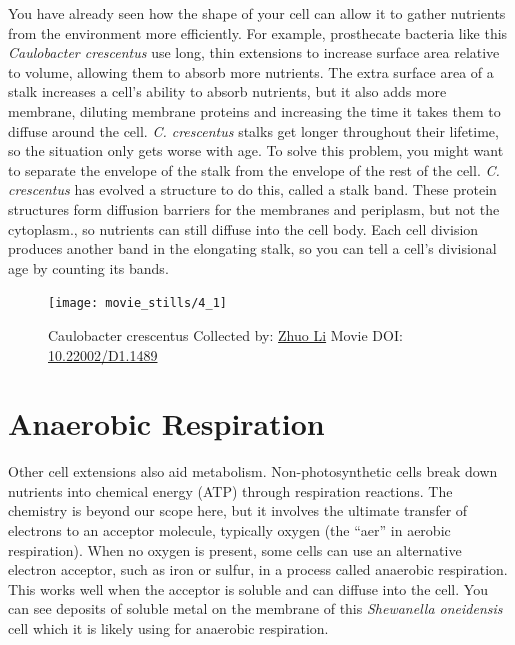\documentclass[]{tufte-book}
\begin{document}
You have already seen how the shape of your cell can allow it to gather
nutrients from the environment more efficiently. For example,
prosthecate bacteria like this \emph{Caulobacter crescentus} use long,
thin extensions to increase surface area relative to volume, allowing
them to absorb more nutrients. The extra surface area of a stalk
increases a cell's ability to absorb nutrients, but it also adds more
membrane, diluting membrane proteins and increasing the time it takes
them to diffuse around the cell. \emph{C. crescentus} stalks get longer
throughout their lifetime, so the situation only gets worse with age. To
solve this problem, you might want to separate the envelope of the stalk
from the envelope of the rest of the cell. \emph{C. crescentus} has
evolved a structure to do this, called a stalk band. These protein
structures form diffusion barriers for the membranes and periplasm, but
not the cytoplasm., so nutrients can still diffuse into the cell body.
Each cell division produces another band in the elongating stalk, so you
can tell a cell's divisional age by counting its bands.





\begin{figure}
\texttt{[image: movie\_stills/4\_1]} \caption[Caulobacter crescentus Collected by:
\protect\hyperlink{zhuo_li}{Zhuo Li} Movie DOI:
\href{https://doi.org/10.22002/D1.1489}{10.22002/D1.1489}]{Caulobacter crescentus Collected by:
\protect\hyperlink{zhuo_li}{Zhuo Li} Movie DOI:
\href{https://doi.org/10.22002/D1.1489}{10.22002/D1.1489}}\label{fig:4-1}
\end{figure}

\section{Anaerobic Respiration}\label{anaerobic-respiration}

Other cell extensions also aid metabolism. Non-photosynthetic cells
break down nutrients into chemical energy (ATP) through respiration
reactions. The chemistry is beyond our scope here, but it involves the
ultimate transfer of electrons to an acceptor molecule, typically oxygen
(the ``aer'' in aerobic respiration). When no oxygen is present, some
cells can use an alternative electron acceptor, such as iron or sulfur,
in a process called anaerobic respiration. This works well when the
acceptor is soluble and can diffuse into the cell. You can see deposits
of soluble metal on the membrane of this \emph{Shewanella oneidensis}
cell which it is likely using for anaerobic respiration.
\end{document}
